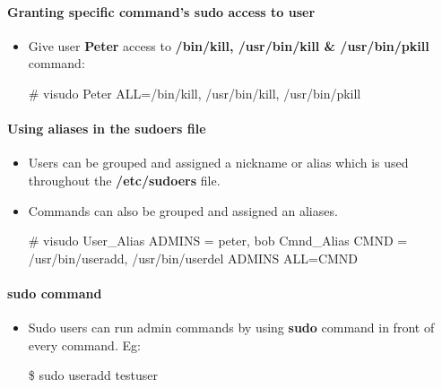 \begin{flushleft}
	\paragraph{Granting specific command's sudo access to user}
	\bigskip
	\begin{itemize}
		\item Give user \textbf{Peter} access to \textbf{/bin/kill, /usr/bin/kill \& /usr/bin/pkill} command:
			\begin{tcolorbox}[breakable,notitle,boxrule=-0pt,colback=black,colframe=black]
			\color{green}
			\font=9pt
			\# visudo
			\newline
			\color{white}
			Peter ALL=/bin/kill, /usr/bin/kill, /usr/bin/pkill
			\font=4pt
		\end{tcolorbox}
	
	\end{itemize}
	
	
	\paragraph{Using aliases in the sudoers file}
	\begin{itemize}
		\item Users can be grouped and assigned a nickname or alias which is used throughout the \textbf{/etc/sudoers} file. 
		\item Commands can also be grouped and assigned an aliases.
		\bigskip
		\begin{tcolorbox}[breakable,notitle,boxrule=-0pt,colback=black,colframe=black]
			\color{green}
			\font=9pt
			\# visudo
			\newline
			\color{white}
			User\_Alias ADMINS = peter, bob
			\newline
			Cmnd\_Alias CMND = /usr/bin/useradd, /usr/bin/userdel 
			\newline
			ADMINS ALL=CMND
			\font=4pt
		\end{tcolorbox}	
	\end{itemize}
	
	
	\paragraph{sudo command}
	\begin{itemize}
		\item Sudo users can run admin commands by using \textbf{sudo} command in front of every command.
		\newline
		Eg:
		\bigskip
		\begin{tcolorbox}[breakable,notitle,boxrule=-0pt,colback=black,colframe=black]
			\color{green}
			\font=9pt
			\$ sudo useradd testuser
			\font=4pt
		\end{tcolorbox}
	\end{itemize}
	

	
\end{flushleft}

\newpage

